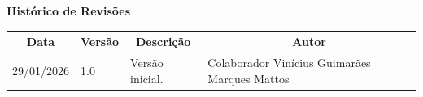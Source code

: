 \begin{table}[h]
	\begin{center}
	    \textbf{\Huge{Histórico de Revisões}}
	\end{center}
    \centering
	\begin{tabular}{|p{3cm}|p{1.5cm}|p{7.5cm}|p{3.2cm}|}
		\hline \multicolumn{1}{|c|}{\textbf{Data}} & \multicolumn{1}{|c|}{\textbf{Versão}} &
			\multicolumn{1}{|c|}{\textbf{Descrição}} & \multicolumn{1}{|c|}{\textbf{Autor}} \\ \hline
		{29/01/2026} & 1.0 & Versão inicial. & {Colaborador Vinícius Guimarães Marques Mattos} \\ \hline
	\end{tabular}
\end{table}
